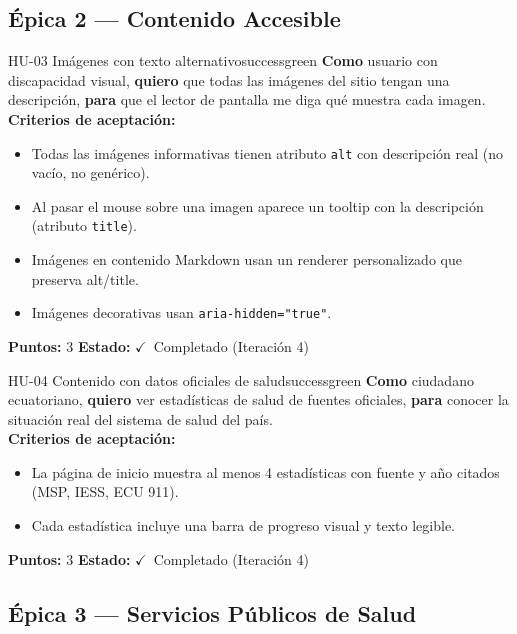 \documentclass[12pt, a4paper]{article}
\newcommand{\cmark}{\textcolor{successgreen}{$\checkmark$}}
\begin{document}
\subsection{Épica 2 --- Contenido Accesible}

\begin{storybox}{HU-03 \quad Imágenes con texto alternativo}{successgreen}
\textbf{Como} usuario con discapacidad visual,
\textbf{quiero} que todas las imágenes del sitio tengan una descripción,
\textbf{para} que el lector de pantalla me diga qué muestra cada imagen.\\[4pt]
\textbf{Criterios de aceptación:}
\begin{itemize}
  \item Todas las imágenes informativas tienen atributo \texttt{alt} con descripción real (no vacío, no genérico).
  \item Al pasar el mouse sobre una imagen aparece un tooltip con la descripción (atributo \texttt{title}).
  \item Imágenes en contenido Markdown usan un renderer personalizado que preserva alt/title.
  \item Imágenes decorativas usan \texttt{aria-hidden="true"}.
\end{itemize}
\textbf{Puntos:} 3 \quad \textbf{Estado:} \cmark~Completado (Iteración 4)
\end{storybox}

\begin{storybox}{HU-04 \quad Contenido con datos oficiales de salud}{successgreen}
\textbf{Como} ciudadano ecuatoriano,
\textbf{quiero} ver estadísticas de salud de fuentes oficiales,
\textbf{para} conocer la situación real del sistema de salud del país.\\[4pt]
\textbf{Criterios de aceptación:}
\begin{itemize}
  \item La página de inicio muestra al menos 4 estadísticas con fuente y año citados (MSP, IESS, ECU 911).
  \item Cada estadística incluye una barra de progreso visual y texto legible.
\end{itemize}
\textbf{Puntos:} 3 \quad \textbf{Estado:} \cmark~Completado (Iteración 4)
\end{storybox}

\subsection{Épica 3 --- Servicios Públicos de Salud}
\end{document}
